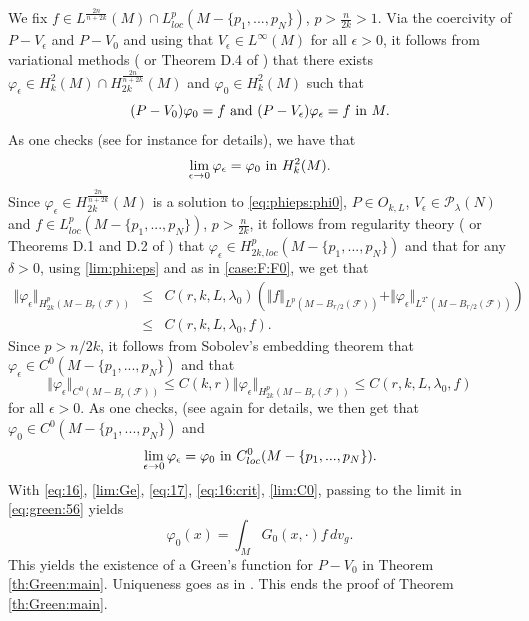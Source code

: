 \documentclass[reqno]{amsart}
\def \eps {\epsilon}
\def \crit {2^\star}
\def \Pl {{\mathcal P}_\lambda}
\def \Mmx {M - \{p_1,...,p_N\}}
\def \F {{\mathcal F}}
\begin{document}
\medskip{} We fix $f\in L^{\frac{2n}{n+2k}}(M)\cap L^p_{loc}(\Mmx)$, $p>\frac{n}{2k}>1$. Via the coercivity of $P-V_\eps$ and $P-V_0$ and using that $V_\eps\in L^\infty(M)$ for all $\eps>0$, it follows from variational methods (\cite{ADN} or Theorem D.4 of \cite{robert:gjms}) that there exists  $\varphi_\eps\in H_k^2(M)\cap H_{2k}^{\frac{2n}{n+2k}}(M)$ and $\varphi_0 \in H_k^2(M)$ such that 
\begin{equation}\label{eq:phieps:phi0}
(P-V_0)\varphi_0=f\hbox{ and }(P-V_\eps)\varphi_\eps=f\hbox{ in }M.
\end{equation}
As one checks (see for instance \cite{robert:gjms} for details), we have that
\begin{equation}\label{lim:phi:eps}
\lim_{\eps\to 0}\varphi_\eps=\varphi_0\hbox{ in }H_k^2(M).
\end{equation}
Since $\varphi_\eps\in H_{2k}^{\frac{2n}{n+2k}}(M)$ is a solution to \eqref{eq:phieps:phi0}, $P\in O_{k,L}$, $V_\eps\in \Pl(N)$ and $f\in L^p_{loc}(M -  \{p_1,...,p_N\})$, $p>\frac{n}{2k}$, it follows from regularity theory (\cite{ADN} or Theorems D.1 and D.2 of \cite{robert:gjms}) that $\varphi_\eps\in H_{2k,loc}^p(M - \{p_1,...,p_N\})$ and that for any $\delta>0$, using \eqref{lim:phi:eps} and as in \eqref{case:F:F0}, we get that
\begin{eqnarray*}
\Vert \varphi_\eps\Vert_{H_{2k}^p(M -  B_r(\F))}&\leq& C( r, k,L,\lambda_0)\left(\Vert f\Vert_{L^p(M -  B_{r/2}(\F))}+\Vert \varphi_\eps\Vert_{L^{\crit}(M -  B_{r/2}(\F))}\right)\\
&\leq& C( r, k,L,\lambda_0, f).
\end{eqnarray*}
Since $p>n/2k$, it follows from Sobolev's embedding theorem that $\varphi_\eps\in C^0(M - \{p_1,...,p_N\})$ and that
\begin{equation*}
\Vert \varphi_\eps\Vert_{C^0(M -  B_r(\F))}\leq C(k,r)\Vert \varphi_\eps\Vert_{H_{2k}^p(M -  B_r(\F))}\leq C( r, k,L,\lambda_0,f)
\end{equation*}
for all $\eps>0$. As one checks, (see again \cite{robert:gjms} for details, we then get that $\varphi_0\in C^0(M - \{p_1,...,p_N\})$ and 
\begin{equation}\label{lim:C0}
\lim_{\eps\to 0}\varphi_\eps=\varphi_0\hbox{ in }C^0_{loc}(\Mmx).
\end{equation}
With \eqref{eq:16}, \eqref{lim:Ge}, \eqref{eq:17}, \eqref{eq:16:crit}, \eqref{lim:C0}, passing to the limit in \eqref{eq:green:56} yields
$$\varphi_0(x)=\int_{M}G_0(x,\cdot)f\, dv_g.$$
This yields the existence of a Green's function for $P-V_0$ in Theorem \ref{th:Green:main}. Uniqueness goes as in \cite{robert:gjms}. This ends the proof of Theorem \ref{th:Green:main}.
\end{document}
